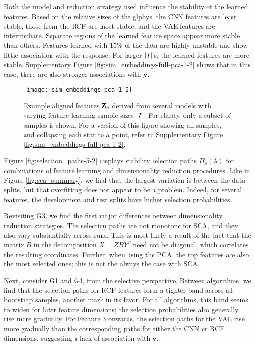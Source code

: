 Both the model and reduction strategy used influence the stability of the
learned features. Based on the relative sizes of the glphys, the CNN features
are least stable, those from the RCF are most stable, and the VAE features are
intermediate. Separate regions of the learned feature space appear more stable
than others. Features learned with 15\% of the data are highly unstable and show
little association with the response. For larger $\left|I\right|$'s, the learned
features are more stable. Supplementary Figure
\ref{fig:sim_embeddings-full-pca-1-2} shows that in this case, there are also
stronger associations with $\mathbf{y}$.

\begin{figure}
  \centering
  \texttt{[image: sim\_embeddings--pca-1-2]}
  \caption{Example aligned features $\protect\underaccent{\bar}{\mathbf{Z}}_{b}$
    derived from several models with varying feature learning sample sizes
    $\left|I\right|$. For clarity, only a subset of samples is shown. For a version
    of this figure showing all samples, and collapsing each star to a point,
    refer to Supplementary Figure \ref{fig:sim_embeddings-full-pca-1-2}.}
  \label{fig:sim_embeddings-pca-1-2}
\end{figure}

Figure \ref{fig:selection_paths-5-2} displays stability selection paths
$\Pi_{k}^{b}\left(\lambda\right)$ for combinations of feature learning and
dimensionality reduction procedures. Like in Figure \ref{fig:cca_summary}, we
find that the largest variation is between the data splits, but that
overfitting does not appear to be a problem. Indeed, for several features, the
development and test splits have higher selection probabilities.

Revisiting G3, we find the first major differences between dimensionality
reduction strategies. The selection paths are not monotone for SCA, and they
also vary substantially across runs. This is most likely a result of the fact
that the matrix $B$ in the decomposition $X = Z B Y^{T}$ need not be diagonal,
which correlates the resulting coordinates. Further, when using the PCA, the top
features are also the most selected ones; this is not the always the case with
SCA.

Next, consider G1 and G4, from the selective perspective. Between algorithms, we
find that the selection paths for RCF features form a tighter band across all
bootstrap samples, another mark in its favor. For all algorithms, this band
seems to widen for later feature dimensions; the selection probabilities also
generally rise more gradually. For Feature 3 onwards, the selection paths for
the VAE rise more gradually than the corresponding paths for either the CNN or
RCF dimensions, suggesting a lack of association with $\mathbf{y}$.

